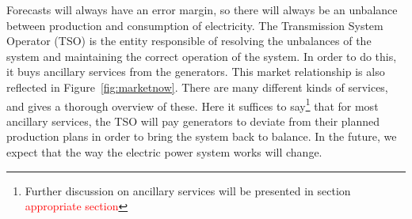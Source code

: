 Forecasts will always have an error margin, so there will always be an unbalance between production and consumption of electricity. The Transmission System Operator (TSO) is the entity responsible of resolving the unbalances of the system and maintaining the correct operation of the system. In order to do this, it buys ancillary services from the generators. This market relationship is also reflected in Figure~\ref{fig:marketnow}. There are many different kinds of services, and  gives a thorough overview of these. Here it suffices to say\footnote{Further discussion on ancillary services will be presented in section \textcolor{red}{appropriate section}} that for most ancillary services, the TSO will pay generators to deviate from their planned production plans in order to bring the system back to balance. In the future, we expect that the way the electric power system works will change.
